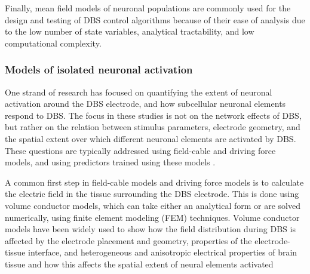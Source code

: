 %
Finally, mean field models of neuronal populations are commonly used
for the design and testing of DBS control algorithms because of their ease
of analysis due to the low number of state variables, analytical tractability,
and low computational complexity.

%
\subsubsection{Models of isolated neuronal activation}
%
%
%
%
%

One strand of research has focused on quantifying the extent of neuronal
activation around the DBS electrode, and how subcellular neuronal elements
respond to DBS. The focus in these studies is not on the network effects of DBS,
but rather on the relation between stimulus parameters, electrode geometry,
and the spatial extent over which different neuronal elements are activated by DBS.
These questions are typically addressed using field-cable and driving force models, and
using predictors trained using these models \cite{gunalan_quantifying_2018}.

A common first step in field-cable models and driving force models is to calculate
the electric field in the tissue surrounding the DBS electrode.
This is done using volume conductor models, which can take either an analytical
form or are solved numerically, using finite element modeling (FEM) techniques.
%
Volume conductor models have been widely used to show how the field distribution
during DBS is affected by the electrode placement and geometry, properties of the
electrode-tissue interface, and heterogeneous and anisotropic electrical properties
of brain tissue and how this affects the spatial extent of neural elements activated
\cite{bossetti_analysis_2008,butson_tissue_2005,grant_effect_2010,schmidt_single_2013,schmidt_single_2013,howell_role_2017,astrom_influence_2012}

